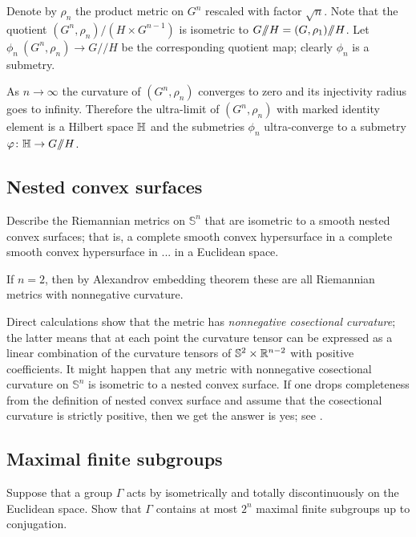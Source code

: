 Denote by $\rho_n$ the product metric on $G^n$ rescaled with factor $\sqrt{n}$.
Note that the quotient $(G^n,\rho_n)/(H\times G^{n-1})$ is isometric to $G/\!\!/H\z=(G,\rho_1)/\!\!/H$.
Let $\phi_n\:(G^n,\rho_n)\to G/\!\!/H$ be the corresponding quotient map; 
clearly $\phi_n$ is a submetry. 

As $n\to\infty$ the curvature of $(G^n,\rho_n)$ converges to zero and its injectivity radius goes to infinity.
Therefore the ultra-limit of $(G^n,\rho_n)$ with marked identity element is a Hilbert space $\mathbb{H}$ and the submetries $\phi_n$ ultra-converge to a submetry $\varphi\colon\mathbb{H}\to G/\!\!/H$.


\subsection*{Nested convex surfaces}

\begin{pr}
Describe the Riemannian metrics on $\mathbb{S}^n$ that are isometric to a smooth nested convex surfaces;
that is, a complete smooth convex hypersurface in a complete smooth convex hypersurface in ... in a Euclidean space.
\end{pr}

If $n=2$, then by Alexandrov embedding theorem these are all Riemannian metrics with nonnegative curvature.

Direct calculations show that the metric has \emph{nonnegative cosectional curvature};
the latter means that at each point the curvature tensor can be expressed as a linear combination of the curvature tensors of $\mathbb{S}^2\times \mathbb{R}^{n-2}$ with positive coefficients.
It might happen that any metric with nonnegative cosectional curvature on $\mathbb{S}^n$ is isometric to a nested convex surface.
If one drops completeness from the definition of nested convex surface
and assume that the cosectional curvature is strictly positive,
then we get the answer is yes; see \cite{petrunin-poly}.



\subsection*{Maximal finite subgroups}

\begin{pr}
Suppose that a group $\Gamma$ acts by isometrically and totally discontinuously on the Euclidean space.
Show that $\Gamma$ contains at most $2^n$ maximal finite subgroups up to conjugation.
\end{pr}

